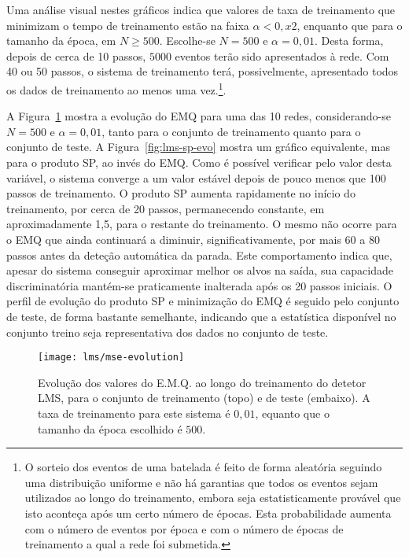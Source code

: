 Uma análise visual nestes gráficos indica que valores de taxa de treinamento
que minimizam o tempo de treinamento estão na faixa $\alpha < 0,x2$,
enquanto que para o tamanho da época, em $N \geq 500$. Escolhe-se $N = 500$ e
$\alpha = 0,01$. Desta forma, depois de cerca de 10 passos, $5000$ eventos
terão sido apresentados à rede. Com 40 ou 50 passos, o sistema de treinamento
terá, possivelmente, apresentado todos os dados de treinamento ao menos uma
vez.\footnote{O sorteio dos eventos de uma batelada é feito de forma aleatória
seguindo uma distribuição uniforme e não há garantias que todos os eventos
sejam utilizados ao longo do treinamento, embora seja estatisticamente
provável que isto aconteça após um certo número de épocas. Esta probabilidade
aumenta com o número de eventos por época e com o número de épocas de
treinamento a qual a rede foi submetida.}.

A Figura~\ref{fig:lms-mse-evo} mostra a evolução do EMQ para uma das 10 redes,
considerando-se $N = 500$ e $\alpha = 0,01$, tanto para o conjunto de
treinamento quanto para o conjunto de teste. A Figura~\ref{fig:lms-sp-evo}
mostra um gráfico equivalente, mas para o produto SP, ao invés do EMQ. Como é
possível verificar pelo valor desta variável, o sistema converge a um valor
estável depois de pouco menos que 100 passos de treinamento. O produto SP
aumenta rapidamente no início do treinamento, por cerca de 20 passos,
permanecendo constante, em aproximadamente 1,5, para o restante do
treinamento. O mesmo não ocorre para o EMQ que ainda continuará a diminuir,
significativamente, por mais 60 a 80 passos antes da deteção automática da
parada. Este comportamento indica que, apesar do sistema conseguir aproximar
melhor os alvos na saída, sua capacidade discriminatória mantém-se
praticamente inalterada após os 20 passos iniciais. O perfil de evolução do
produto SP e minimização do EMQ é seguido pelo conjunto de teste, de forma
bastante semelhante, indicando que a estatística disponível no conjunto treino
seja representativa dos dados no conjunto de teste.


\begin{figure}
\begin{center}
\texttt{[image: lms/mse-evolution]}
\end{center}
\caption{Evolução dos valores do E.M.Q. ao longo do treinamento do detetor
LMS, para o conjunto de treinamento (topo) e de teste (embaixo). A taxa de
treinamento para este sistema é $0,01$, equanto que o tamanho da época
escolhido é $500$.}
\label{fig:lms-mse-evo}
\end{figure}

